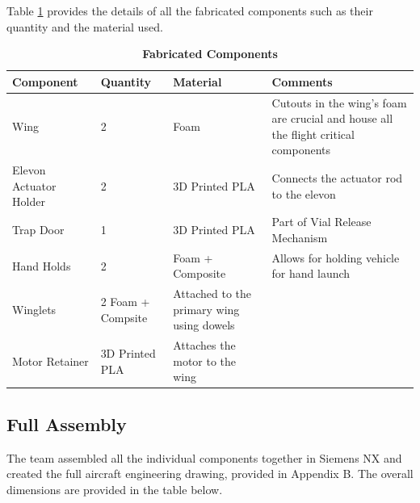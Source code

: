     
        Table \ref{table:fab_components} provides the details of all the fabricated components such as their quantity and the material used.
    
    
     \begin{table}[H]
         \begin{center}
         \caption{\textbf{Fabricated Components}} \label{table:fab_components}
         \begin{tabular}{|p{2in}|p{1in}|p{1in}|p{1in}|} %
             \hline \textbf{Component} & \textbf{Quantity} & \textbf{Material} & \textbf{Comments} \\ \hline %
             Wing & 2 & Foam & Cutouts in the wing's foam are crucial and house all the flight critical components \\ \hline
             Elevon Actuator Holder & 2 & 3D Printed PLA & Connects the actuator rod to the elevon \\ \hline
             Trap Door & 1 & 3D Printed PLA & Part of Vial Release Mechanism \\ \hline
             Hand Holds & 2 & Foam + Composite & Allows for holding vehicle for hand launch \\ \hline
             Winglets & 2 Foam + Compsite & Attached to the primary wing using dowels \\  \hline
             Motor Retainer & 3D Printed PLA & Attaches the motor to the wing \\ \hline
             
         \end{tabular}
         \end{center}
     \end{table}
    
    \subsection{Full Assembly}
    
    The team assembled all the individual components together in Siemens NX and created the full aircraft engineering drawing, provided in Appendix B. The overall dimensions are provided in the table below.
    
